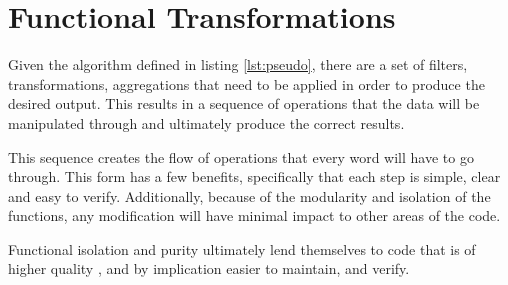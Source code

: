 \chapter{Functional Transformations}

\begin{minipage}{\linewidth}

\end{minipage} 

Given the algorithm defined in listing \ref{lst:pseudo}, there are a set of filters, transformations, aggregations that need to be applied in order to produce the desired output.  This results in a sequence of operations that the data will be manipulated through and ultimately produce the correct results.

This sequence creates the flow of operations that every word will have to go through.  This form has a few benefits, specifically that each step is simple, clear and easy to verify.  Additionally, because of the modularity and isolation of the functions, any modification will have minimal impact to other areas of the code.

Functional isolation and purity ultimately lend themselves to code that is of higher quality \cite{langstudy14}, and by implication easier to maintain, and verify.


%